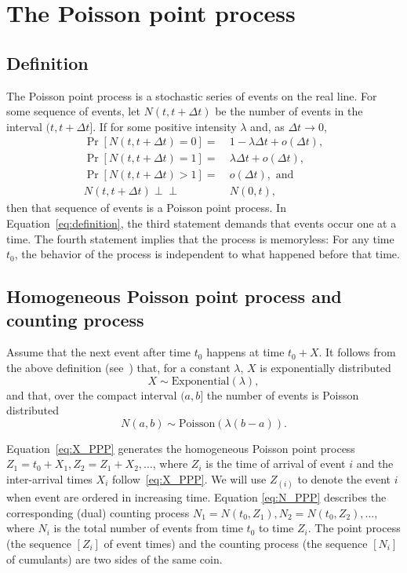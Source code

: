 \documentclass[article,nojss]{jss}\usepackage[]{graphicx}\usepackage[]{xcolor}
\newcommand{\indep}{\perp \!\!\! \perp}
\begin{document}
\section{The Poisson point process} \label{sec:review}
\subsection{Definition}
The Poisson point process is a stochastic series of events on the real line. For some sequence of events, let $N(t, t + \Delta t)$ be the number of events in the interval $(t, t  + \Delta t]$. If for some positive intensity $\lambda$ and, as ${\Delta t \rightarrow 0}$,
\begin{equation}\label{eq:definition}
    \begin{aligned}
    \Pr[N(t, t + \Delta t) = 0] =&\  1 - \lambda \Delta t +  o(\Delta t), \\
    \Pr[N(t, t + \Delta t) = 1] =&\  \lambda \Delta t +  o(\Delta t), \\
    \Pr[N(t, t + \Delta t) >1] =&\  o(\Delta t),\text{ and } \\
    N(t, t + \Delta t) \indep&\ N(0, t),
    \end{aligned}
\end{equation}
then that sequence of events is a Poisson point process. In Equation~\eqref{eq:definition}, the third statement demands that events occur one at a time. The fourth statement implies that the process is memoryless: For any time $t_0$, the behavior of the process is independent to what happened before that time.

\subsection{Homogeneous Poisson point process and counting process}\label{sec:ppp-intro}
Assume that the next event after time $t_0$ happens at time $t_0 + X$. It follows from the above definition (see~\citet[par. 4.1]{cox1965theory}) that, for a constant $\lambda$, $X$ is exponentially distributed
\begin{equation}\label{eq:X_PPP}
X \sim \text{Exponential}(\lambda),
\end{equation}
and that, over the compact interval $(a, b]$ the number of events is Poisson distributed
\begin{equation}\label{eq:N_PPP}
N(a, b) \sim \text{Poisson}(\lambda (b-a)).
\end{equation}

Equation~\eqref{eq:X_PPP} generates the homogeneous Poisson point process ${Z_1 = t_0 + X_1, Z_2 = Z_1 + X_2, \dots}$, where $Z_i$ is the time of arrival of event $i$ and the inter-arrival times $X_i$ follow~\eqref{eq:X_PPP}. We will use $Z_{(i)}$ to denote the event $i$ when event are ordered in increasing time.
%
Equation \eqref{eq:N_PPP} describes the corresponding (dual) counting process
${N_1 = N(t_0, Z_1)}, {N_2 = N(t_0, Z_2), \dots}$, where $N_i$ is the total number of events from time $t_0$ to time $Z_i$. The point process (the sequence $[Z_i]$ of event times) and the counting process (the sequence $[N_i]$ of cumulants) are two sides of the same coin.
\end{document}
